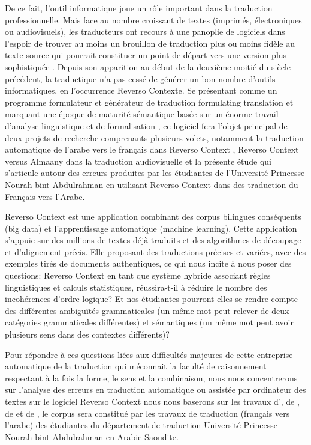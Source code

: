 \documentclass{textolivre}
\begin{document}
De ce fait, l’outil informatique joue un rôle important dans la traduction professionnelle. Mais face au nombre croissant de textes (imprimés, électroniques ou audiovisuels), les traducteurs ont recours à une panoplie de logiciels dans l’espoir de trouver au moins un brouillon de traduction plus ou moins fidèle au texte source qui pourrait constituer un point de départ vers une version plus sophistiquée \cite[p. 120]{arnold2003}. Depuis son apparition au début de la deuxième moitié du siècle précédent, la traductique n’a pas cessé de générer un bon nombre d’outils informatiques, en l’occurrence Reverso Contexte. Se présentant comme un programme formulateur et générateur de traduction formulating translation \cite[p. 5]{fulford2005} et marquant une époque de maturité sémantique basée sur un énorme travail d’analyse linguistique et de formalisation \cite[p. 119]{anis1995}, ce logiciel fera l’objet principal de deux projets de recherche comprenants plusieurs volets,  notamment la traduction automatique de l’arabe vers le français dans Reverso Context \cite{bedjaoui2021}, Reverso Context versus Almaany dans la  traduction audiovisuelle \cite{zemni2020} et la présente étude qui s’articule autour des erreurs produites par les étudiantes de l’Université Princesse Nourah bint Abdulrahman en utilisant Reverso Context dans des traduction du Français vers l’Arabe.

Reverso Context est une application combinant des corpus bilingues conséquents (big data) et l'apprentissage automatique (machine learning). Cette application s’appuie sur des millions de textes déjà traduits et des algorithmes de découpage et d'alignement précis. Elle proposant des traductions précises et variées, avec des exemples tirés de documents authentiques, ce qui nous incite à nous poser des questions: Reverso Context en tant que système hybride associant règles linguistiques et calculs statistiques, réussira-t-il à réduire le nombre des incohérences d’ordre logique? Et nos étudiantes pourront-elles se rendre compte des différentes ambiguïtés grammaticales (un même mot peut relever de deux catégories grammaticales différentes) et sémantiques (un même mot peut avoir plusieurs sens dans des contextes différents)?

Pour répondre à ces questions liées aux difficultés majeures de cette entreprise automatique de la traduction qui méconnait la faculté de raisonnement respectant à la fois la forme, le sens et la combinaison, nous nous concentrerons sur l'analyse des erreurs en traduction automatique ou assistée par ordinateur des textes sur le logiciel Reverso Context nous nous baserons sur les travaux d’\textcite{elliott2004}, de \textcite{llitjos2005}, de \textcite{vilar2006} et de \textcite{bojar2011}, le corpus sera constitué par les travaux de traduction (français vers l’arabe) des étudiantes du département de traduction Université Princesse Nourah bint Abdulrahman en Arabie Saoudite.
\end{document}
